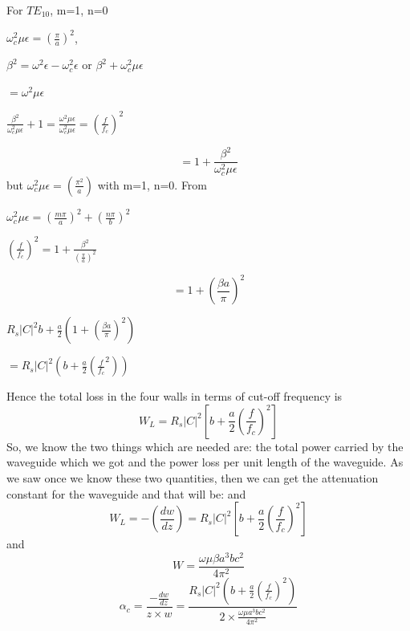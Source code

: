 For $TE_{10}$, m=1, n=0
\begin{center}
$\omega_c^2\mu\epsilon=(\frac{\pi}{a})^2$,	
\end{center}
\begin{center}
$\beta^2=\omega^2\epsilon-\omega_c^2\epsilon$ or $\beta^2 + \omega_c^2\mu\epsilon$	
\end{center}
\begin{center}
$= \omega^2\mu\epsilon$	
\end{center}
\begin{center}
$\frac{\beta^2}{\omega_c^2\mu\epsilon}+1=\frac{\omega^2\mu\epsilon}{\omega_c^2\mu\epsilon}=(\frac{f}{f_c})^2$	
\end{center}
\begin{equation}
= 1+ \frac{\beta^2}{\omega_c^2\mu\epsilon}	
\end{equation}
but $\omega_c^2\mu\epsilon=(\frac{\pi^2}{a})$ with m=1, n=0. From 
\begin{center}
$\omega_c^2\mu\epsilon=(\frac{m\pi}{a})^2 + (\frac{n\pi}{b})^2$	
\end{center}
\begin{center}
$(\frac{f}{f_c})^2= 1+\frac{\beta^2}{(\frac{\pi}{a})^2}$	
\end{center}
\begin{equation}
=1+ (\frac{\beta a}{\pi})^2	
\end{equation}
\begin{center}
$R_s|C|^2 b+\frac{a}{2}(1+(\frac{\beta a}{\pi})^2)$	
\end{center}
\begin{center}
$=R_s|C|^2(b+\frac{a}{2}(\frac{f}{f_c}^2))$	
\end{center}
Hence the total loss in the four walls in terms of cut-off frequency is
\begin{equation}
W_L=R_s|C|^2[b+\frac{a}{2}(\frac{f}{f_c})^2]	
\end{equation}
So, we know the two things which are needed are: the total power carried by the waveguide which we got and the power loss per unit length of the waveguide. As we saw once we know these two quantities, then we can get the attenuation constant for the waveguide and that will be:
and 
\begin{equation}
W_L=-(\frac{dw}{dz})= R_s|C|^2[b+\frac{a}{2}(\frac{f}{f_c})^2]	
\end{equation}
and
\begin{equation}
W=\frac{\omega\mu\beta a^3bc^2}{4\pi^2}
\end{equation}
\begin{equation}
\alpha_{c}=\frac{-\frac{dw}{dz}}{z\times w}=\frac{R_s|C|^2(b+\frac{a}{2}(\frac{f}{f_c})^2)}{2\times\frac{\omega\mu a^3bc^2}{4\pi^2}}
\end{equation}
